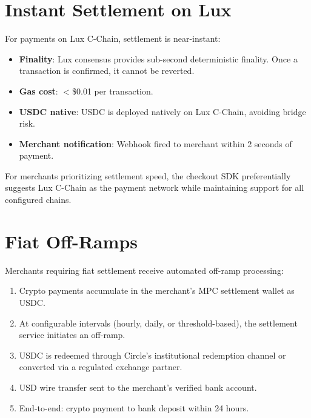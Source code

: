 \documentclass[11pt]{article}
\begin{document}
\section{Instant Settlement on Lux}
\label{sec:lux}

For payments on Lux C-Chain, settlement is near-instant:

\begin{itemize}[leftmargin=1.4em]
    \item \textbf{Finality}: Lux consensus provides sub-second deterministic
    finality. Once a transaction is confirmed, it cannot be reverted.
    \item \textbf{Gas cost}: $<$\$0.01 per transaction.
    \item \textbf{USDC native}: USDC is deployed natively on Lux C-Chain,
    avoiding bridge risk.
    \item \textbf{Merchant notification}: Webhook fired to merchant
    within 2 seconds of payment.
\end{itemize}

For merchants prioritizing settlement speed, the checkout SDK
preferentially suggests Lux C-Chain as the payment network while
maintaining support for all configured chains.

\section{Fiat Off-Ramps}
\label{sec:offramp}

Merchants requiring fiat settlement receive automated off-ramp
processing:

\begin{enumerate}[leftmargin=1.4em]
    \item Crypto payments accumulate in the merchant's MPC settlement
    wallet as USDC.
    \item At configurable intervals (hourly, daily, or threshold-based),
    the settlement service initiates an off-ramp.
    \item USDC is redeemed through Circle's institutional redemption
    channel or converted via a regulated exchange partner.
    \item USD wire transfer sent to the merchant's verified bank account.
    \item End-to-end: crypto payment to bank deposit within 24 hours.
\end{enumerate}
\end{document}
